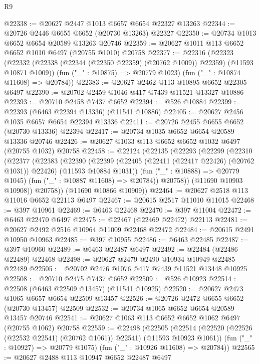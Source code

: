 \begin{lexlean}{R9}
\begin{coremodule}
@22338 := @20627 @2447 @1013 @6657 @6654 @22327 @13263
@22344 := @20726 @2446 @6655 @6652 (@20730 @13263) @22327
@22350 := @20734 @1013 @6652 @6654 @20589 @13263 @20746
@22359 := @20627 @1011 @113 @6652 @6652 @1010 @6497 (@20755 @1010) @20758
@22377 := @22316
    (@22323
      (@22332 (@22338 (@22344 (@22350 @22359) (@20762 @1009)) @22359) (@11593 @10871 @1009))
      (fun ("_" : @10875) => @20779 @1023)
      (fun ("_" : @10874 @11608) => @20784))
@22383 := @20627 @2462 @113 @10895 @6652 @22305 @6497
@22390 := @20702 @2459 @1046 @417 @7439 @11521 @13327 @10886
@22393 := @20710 @2458 @7437 @6652
@22394 := @526 @10884
@22399 := @22393 (@6463 @22394 @13336) (@11541 @10886)
@22405 := @20627 @2456 @1035 @6657 @6654 @22394 @13336
@22411 := @20726 @2455 @6655 @6652 (@20730 @13336) @22394
@22417 := @20734 @1035 @6652 @6654 @20589 @13336 @20746
@22426 := @20627 @1033 @113 @6652 @6652 @1032 @6497 (@20755 @1032) @20758
@22458 := @22124
    (@22135
      (@22293
        (@22299
          (@22310
            (@22377
              (@22383
                (@22390
                  (@22399
                    (@22405 (@22411 (@22417 @22426) (@20762 @1031)) @22426)
                    (@11593 @10884 @1031))
                  (fun ("_" : @10888) => @20779 @1045)
                  (fun ("_" : @10887 @11608) => @20784))
                @20758))
            (@11690 @10903 @10908))
          @20758))
      (@11690 @10866 @10909))
@22464 := @20627 @2518 @113 @11016 @6652 @22113 @6497
@22467 := @20615 @2517 @11010 @11015
@22468 := @397 @10961
@22469 := @6463 @22468
@22470 := @397 @11004
@22472 := @6463 @22470 @6497
@22475 := @22467 (@22469 @22472) @22113
@22481 := @20627 @2492 @2516 @10964 @11009 @22468 @22472
@22484 := @20615 @2491 @10950 @10963
@22485 := @397 @10955
@22486 := @6463 @22485
@22487 := @397 @10960
@22489 := @6463 @22487 @6497
@22492 := @22484 (@22486 @22489) @22468
@22498 := @20627 @2479 @2490 @10934 @10949 @22485 @22489
@22505 := @20702 @2476 @1076 @417 @7439 @11521 @13448 @10925
@22508 := @20710 @2475 @7437 @6652
@22509 := @526 @10923
@22514 := @22508 (@6463 @22509 @13457) (@11541 @10925)
@22520 := @20627 @2473 @1065 @6657 @6654 @22509 @13457
@22526 := @20726 @2472 @6655 @6652 (@20730 @13457) @22509
@22532 := @20734 @1065 @6652 @6654 @20589 @13457 @20746
@22541 := @20627 @1063 @113 @6652 @6652 @1062 @6497 (@20755 @1062) @20758
@22559 := @22498
    (@22505
      (@22514 (@22520 (@22526 (@22532 @22541) (@20762 @1061)) @22541) (@11593 @10923 @1061))
      (fun ("_" : @10927) => @20779 @1075)
      (fun ("_" : @10926 @11608) => @20784))
@22565 := @20627 @2488 @113 @10947 @6652 @22487 @6497

\end{coremodule}
\end{lexlean}
